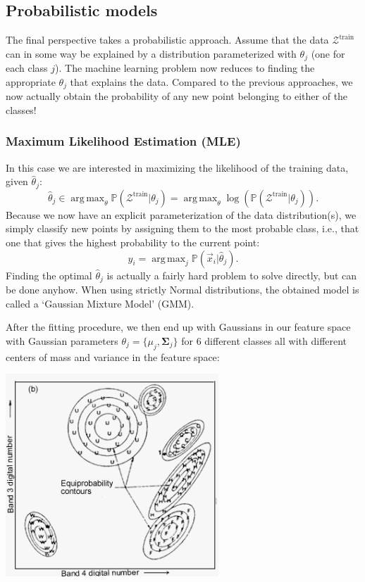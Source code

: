 \documentclass{article}
\DeclareMathOperator*{\argmax}{arg\,max}
\begin{document}
\newpage
\subsection{Probabilistic models}
The final perspective takes a probabilistic approach. Assume that the data $\mathcal{Z}^\text{train}$ can in some way be explained by a distribution parameterized with $\theta_j$ (one for each class $j$). The machine learning problem now reduces to finding the appropriate $\theta_j$ that explains the data. Compared to the previous approaches, we now actually obtain the probability of any new point belonging to either of the classes!


\subsubsection{Maximum Likelihood Estimation (MLE)}
In this case we are interested in maximizing the likelihood of the training data, given $\hat{\theta}_j$:
\begin{equation}
    \hat{\theta}_j\in\argmax_\theta \mathbb{P}(\mathcal{Z}^\text{train}|\theta_j) = \argmax_\theta \log\left( \mathbb{P}(\mathcal{Z}^\text{train}|\theta_j) \right).
\end{equation}
Because we now have an explicit parameterization of the data distribution(s), we simply classify new points by assigning them to the most probable class, i.e., that one that gives the highest probability to the current point:
\begin{equation}
    y_i = \argmax_j \mathbb{P}(\vec{x}_i|\hat{\theta}_j).
\end{equation}
Finding the optimal $\hat{\theta}_j$ is actually a fairly hard problem to solve directly, but can be done anyhow. When using strictly Normal distributions, the obtained model is called a `Gaussian Mixture Model' (GMM).
\begin{testexample}
    After the fitting procedure, we then end up with Gaussians in our feature space with Gaussian parameters $\theta_j=\{\mu_j,\bm{\Sigma}_j\}$ for 6 different classes all with different centers of mass and variance in the feature space:
    \begin{center}\includegraphics[width=0.6\textwidth,trim={0.5cm 0.35cm 0 0},clip]{MLE_class.jpg}\end{center}
\end{testexample}
\end{document}
